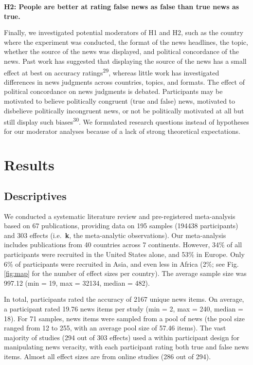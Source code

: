 \documentclass[
  man]{apa6}
\begin{document}
\textbf{H2: People are better at rating false news as false than true news as true.}

Finally, we investigated potential moderators of H1 and H2, such as the country where the experiment was conducted, the format of the news headlines, the topic, whether the source of the news was displayed, and political concordance of the news. Past work has suggested that displaying the source of the news has a small effect at best on accuracy ratings\textsuperscript{29}, whereas little work has investigated differences in news judgments across countries, topics, and formats. The effect of political concordance on news judgments is debated. Participants may be motivated to believe politically congruent (true and false) news, motivated to disbelieve politically incongruent news, or not be politically motivated at all but still display such biases\textsuperscript{30}. We formulated research questions instead of hypotheses for our moderator analyses because of a lack of strong theoretical expectations.

\section{Results}\label{results}

\subsection{Descriptives}\label{descriptives}

We conducted a systematic literature review and pre-registered meta-analysis based on 67 publications, providing data on 195 samples (194438 participants) and 303 effects (i.e.~\textbf{k}, the meta-analytic observations). Our meta-analysis includes publications from 40 countries across 7 continents. However, 34\% of all participants were recruited in the United States alone, and 53\% in Europe. Only 6\% of participants were recruited in Asia, and even less in Africa (2\%; see Fig. \ref{fig:map} for the number of effect sizes per country). The average sample size was 997.12 (min = 19, max = 32134, median = 482).

In total, participants rated the accuracy of 2167 unique news items. On average, a participant rated 19.76 news items per study (min = 2, max = 240, median = 18). For 71 samples, news items were sampled from a pool of news (the pool size ranged from 12 to 255, with an average pool size of 57.46 items). The vast majority of studies (294 out of 303 effects) used a within participant design for manipulating news veracity, with each participant rating both true and false news items. Almost all effect sizes are from online studies (286 out of 294).
\end{document}
